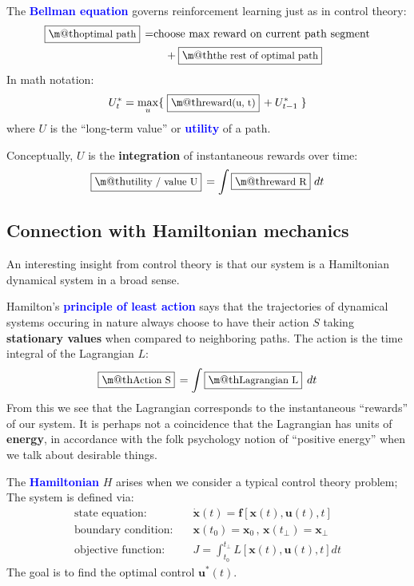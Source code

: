 \documentclass[orivec]{llncs}
\makeatletter
\newcommand{\emp}[1]{\textbf{\textcolor{blue}{#1}}}
\newcommand{\vect}[1]{\boldsymbol{#1}}
\renewcommand{\boxed}[1]{\fbox{\m@th$\displaystyle\scalebox{0.9}{#1}$} \,}
\makeatother
\begin{document}
The \emp{Bellman equation} governs reinforcement learning just as in control theory:
\begin{eqnarray}
\boxed{\mbox{optimal path}} = & \mbox{choose max reward on current path segment} \nonumber \\
& \quad + \boxed{\mbox{the rest of optimal path}}
\end{eqnarray}
In math notation:
\begin{equation}
U^*_t = \max_{u} \{ \; \boxed{\mbox{reward}(u, t)} + U^*_{t-1} \; \}
\end{equation}
where $U$ is the ``long-term value'' or \emp{utility} of a path.

Conceptually, $U$ is the \textbf{integration} of instantaneous rewards over time:
\begin{equation}
\boxed{\mbox{utility / value} U} = \int \boxed{\mbox{reward} R} \,dt
\end{equation}

\subsection{Connection with Hamiltonian mechanics}

An interesting insight from control theory is that our system is a Hamiltonian dynamical system in a broad sense.

Hamilton's \emp{principle of least action} says that the trajectories of dynamical systems occuring in nature always choose to have their action $S$ taking \textbf{stationary values} when compared to neighboring paths.  The action is the time integral of the Lagrangian $L$:
\begin{equation}
\boxed{\mbox{Action} S} = \int \boxed{\mbox{Lagrangian} L} \; dt
\end{equation}
From this we see that the Lagrangian corresponds to the instantaneous ``rewards'' of our system.  It is perhaps not a coincidence that the Lagrangian has units of \textbf{energy}, in accordance with the folk psychology notion of ``positive energy'' when we talk about desirable things.

The \emp{Hamiltonian} $H$ arises when we consider a typical control theory problem;  The system is defined via:
\begin{eqnarray}
\mbox{state equation:} \quad & \dot{\vect{x}}(t) = \vect{f}[\vect{x}(t), \vect{u}(t), t] \\
\mbox{boundary condition:} \quad & \vect{x}(t_0) = \vect{x}_0 \,,\, \vect{x}(t_\bot) = \vect{x}_\bot \\
\mbox{objective function:} \quad & J = \int_{t_0}^{t_\bot} L[\vect{x}(t), \vect{u}(t), t] dt
\end{eqnarray}
The goal is to find the optimal control $\vect{u}^*(t)$.
\end{document}
